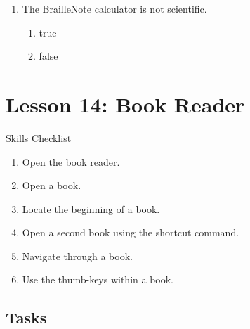 \documentclass[10pt,letterpaper,twoside]{report}
\begin{document}
{{{{\begin{enumerate}
	      \begin{enumerate}
		      \item enter with h
		            
		      \item backspace with h
		            
		      \item space with h
		            
		      \item none of the above
		            
		            
	      \end{enumerate}
	\item The BrailleNote calculator is not scientific.
	      
	      \begin{enumerate}
		      \item true
		            
		      \item false
	      \end{enumerate}
\end{enumerate}



\section*{Lesson 14: Book Reader}


Skills Checklist



\begin{enumerate}
	\item Open the book reader.
	      
	\item Open a book.
	      
	\item Locate the beginning of a book.
	      
	\item Open a second book using the shortcut command.
	      
	\item Navigate through a book.
	      
	\item Use the thumb-keys within a book.
\end{enumerate}



 \subsection{Tasks}



}}}}
\end{document}

